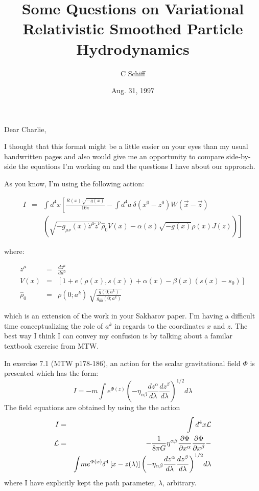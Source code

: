 \documentclass{article}
\begin{document}
\title{Some Questions on Variational Relativistic Smoothed Particle Hydrodynamics}
\author{C Schiff}
\date{Aug. 31, 1997}
\maketitle

Dear Charlie,

I thought that this format might be a little easier on your eyes than my usual handwritten pages and also would give me an opportunity to compare side-by-side the equations I'm working on and the questions I have about our approach.

As you know, I'm using the following action:

\begin{eqnarray}
I &  = &  \int \! {d^4}x  \left[  \frac{R(x){\sqrt{-g(x)}}}{16\pi} - \int \! {d^4}a \ \delta(x^0 - z^0) W({\vec x} - {\vec z}) \right. \nonumber \\
& &
  \left. \left( \sqrt{-g_{\mu\nu}(x){\dot z}^{\mu}{\dot z}^{\nu}} {\hat \rho}_{0} V(x) -\alpha(x)\sqrt{-g(x)} \rho(x) J(z) \right) \right] 
\end{eqnarray}

where:

\begin{eqnarray}
{\dot z}^{\mu} & = & \frac{d z^{\mu}}{d a^{0}}  \\
V(x) & = & \left[1 + e(\rho(x),s(x)) + \alpha(x) - \beta(x) (s(x) - s_{0}) \right]  \\
{\hat \rho}_{0} & = & \rho(0;a^k) \ \sqrt{ \frac{\bar g(0;a^k)}{g_{\bar 0 \bar 0}(0;a^k)}}
\end{eqnarray}

which is an extension of the work in your Sakharov paper.  I'm having a difficult time conceptualizing the role of $a^k$ in regards to the coordinates $x$ and $z$.  The best way I think I can convey my confusion is by talking about a familar textbook exercise from MTW.

In exercise 7.1 (MTW p178-186), an action for the scalar gravitational field $\Phi$ is presented which has the form:
\begin{equation}
I = -m \int e^{\Phi(z)} \left( -\eta_{\alpha \beta}\frac{dz^{\alpha}}{d\lambda}\frac{dz^{\beta}}{d\lambda}\right)^{1/2} d\lambda
\end{equation}
The field equations are obtained by using the the action
\begin{eqnarray}
I &  = & \int d^4x {\cal L} \\
{\cal L} & = & -\frac{1}{8 \pi G} \eta^{\alpha \beta} \frac{\partial \Phi}{\partial x^{\alpha}}\frac{\partial \Phi}{\partial x^{\beta}} - \nonumber \\
& & \int \! m e^{\Phi(x)} \delta^4 \left[ x - z(\lambda) \right] \left( -\eta_{\alpha \beta}\frac{dz^{\alpha}}{d\lambda}\frac{dz^{\beta}}{d\lambda}\right)^{1/2}\! d\lambda
\end{eqnarray}
where I have explicitly kept the path parameter, $\lambda$, arbitrary.
\end{document}
